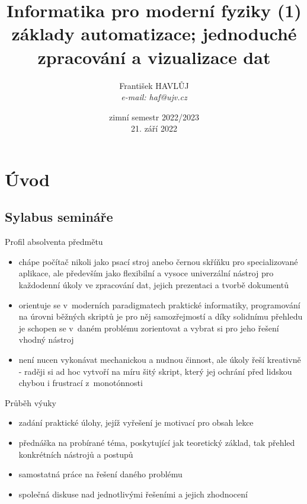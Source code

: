 \documentclass{beamer}
\title[IMF (1)]{Informatika pro moderní fyziky (1)\\základy automatizace; jednoduché zpracování a vizualizace dat}
\author[Franti\v{s}ek HAVL\r{U}J, ORF ÚJV Řež]{Franti\v{s}ek HAVL\r{U}J\\{\scriptsize \emph{e-mail: haf@ujv.cz}}}
\date{zimní semestr 2022/2023\\21. září 2022}
\institute[ORF ÚJV Řež]
{ÚJV Řež\\oddělení Reaktorové fyziky a podpory palivového cyklu}
\begin{document}
\begin{frame}
  \titlepage
\end{frame}

\begin{frame}
  \tableofcontents
\end{frame}

\section{Úvod}

\subsection{Sylabus semináře}

\begin{frame}{Profil absolventa předmětu}
  \begin{itemize}
    \item chápe počítač nikoli jako psací stroj anebo černou skříňku pro specializované aplikace, ale především jako flexibilní a vysoce univerzální nástroj pro každodenní úkoly ve zpracování dat, jejich prezentaci a tvorbě dokumentů
    \item orientuje se v~moderních paradigmatech praktické informatiky, programování na úrovni běžných skriptů je pro něj samozřejmostí a díky solidnímu přehledu je schopen se v~daném problému zorientovat a vybrat si pro jeho řešení vhodný nástroj
    \item není nucen vykonávat mechanickou a nudnou činnost, ale úkoly řeší kreativně - raději si ad hoc vytvoří na míru šitý skript, který jej ochrání před lidskou chybou i frustrací z~monotónnosti
  \end{itemize}
\end{frame}

\begin{frame}{Průběh výuky}
  \begin{itemize}
    \item zadání praktické úlohy, jejíž vyřešení je motivací pro obsah lekce
    \item přednáška na probírané téma, poskytující jak teoretický základ, tak přehled konkrétních nástrojů a postupů
    \item samostatná práce na řešení daného problému
    \item společná diskuse nad jednotlivými řešeními a jejich zhodnocení
  \end{itemize}
\end{frame}
\end{document}
